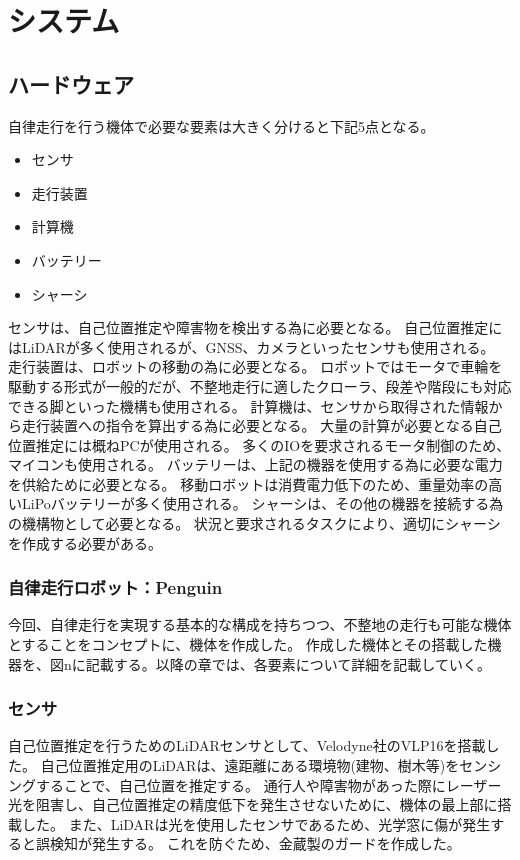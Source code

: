 \section{システム}


\subsection{ハードウェア}
自律走行を行う機体で必要な要素は大きく分けると下記5点となる。

\begin{itemize}
    \item センサ
    \item 走行装置
    \item 計算機
    \item バッテリー
    \item シャーシ
\end{itemize}

センサは、自己位置推定や障害物を検出する為に必要となる。
自己位置推定にはLiDARが多く使用されるが、GNSS、カメラといったセンサも使用される。 
走行装置は、ロボットの移動の為に必要となる。
ロボットではモータで車輪を駆動する形式が一般的だが、不整地走行に適したクローラ、段差や階段にも対応できる脚といった機構も使用される。 
計算機は、センサから取得された情報から走行装置への指令を算出する為に必要となる。
大量の計算が必要となる自己位置推定には概ねPCが使用される。
多くのIOを要求されるモータ制御のため、マイコンも使用される。 
バッテリーは、上記の機器を使用する為に必要な電力を供給ために必要となる。
移動ロボットは消費電力低下のため、重量効率の高いLiPoバッテリーが多く使用される。 
シャーシは、その他の機器を接続する為の機構物として必要となる。
状況と要求されるタスクにより、適切にシャーシを作成する必要がある。

\subsubsection{自律走行ロボット：Penguin}
今回、自律走行を実現する基本的な構成を持ちつつ、不整地の走行も可能な機体とすることをコンセプトに、機体を作成した。 
作成した機体とその搭載した機器を、図nに記載する。以降の章では、各要素について詳細を記載していく。

\subsubsection{センサ}
自己位置推定を行うためのLiDARセンサとして、Velodyne社のVLP16を搭載した。
自己位置推定用のLiDARは、遠距離にある環境物(建物、樹木等)をセンシングすることで、自己位置を推定する。
通行人や障害物があった際にレーザー光を阻害し、自己位置推定の精度低下を発生させないために、機体の最上部に搭載した。
また、LiDARは光を使用したセンサであるため、光学窓に傷が発生すると誤検知が発生する。
これを防ぐため、金蔵製のガードを作成した。

